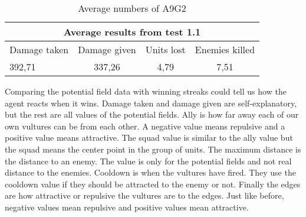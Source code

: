 \begin{centering}
\begin{table}
 \begin{tabular}{|l|c|c|c|}
	\multicolumn{4}{c}{Average results from test 1.1} \\
	\hline
		Damage taken & Damage given & Units lost & Enemies killed\\
	\hline
		392,71 & 337,26 & 4,79 & 7,51 \\
	\hline
\end{tabular}
\caption{Average numbers of A9G2}
\label{test1.1}
\end{table}
\end{centering}
\newpage
Comparing the potential field data with winning streaks could tell us how the agent reacts when it wins. Damage taken and damage given are self-explanatory, but the rest are all values of the potential fields. Ally is how far away each of our own vultures can be from each other. A negative value means repulsive and a positive value means attractive. The squad value is similar to the ally value but the squad means the center point in the group of units. The maximum distance is the distance to an enemy. The value is only for the potential fields and not real distance to the enemies. Cooldown is when the vultures have fired. They use the cooldown value if they should be attracted to the enemy or not. Finally the edges are how attractive or repulsive the vultures are to the edges. Just like before, negative values mean repulsive and positive values mean attractive. 
\newpage
